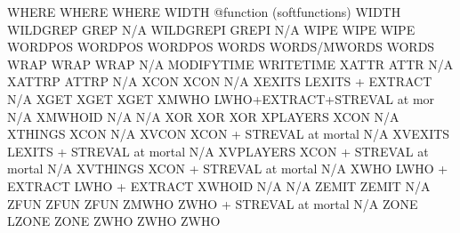 \documentclass[letterpaper,10pt,english]{sphinxmanual}
\begin{document}
\begin{description}
WHERE                   WHERE                        WHERE
WIDTH                   @function (softfunctions)    WIDTH
WILDGREP                GREP                         N/A
WILDGREPI               GREPI                        N/A
WIPE                    WIPE                         WIPE
WORDPOS                 WORDPOS                      WORDPOS
WORDS                   WORDS/MWORDS                 WORDS
WRAP                    WRAP                         WRAP
N/A                     MODIFYTIME                   WRITETIME
XATTR                   ATTR                         N/A
XATTRP                  ATTRP                        N/A
XCON                    XCON                         N/A
XEXITS                  LEXITS + EXTRACT             N/A
XGET                    XGET                         XGET
XMWHO                   LWHO+EXTRACT+STREVAL at mor  N/A
XMWHOID                 N/A                          N/A
XOR                     XOR                          XOR
XPLAYERS                XCON                         N/A
XTHINGS                 XCON                         N/A
XVCON                   XCON + STREVAL at mortal     N/A
XVEXITS                 LEXITS + STREVAL at mortal   N/A
XVPLAYERS               XCON + STREVAL at mortal     N/A
XVTHINGS                XCON + STREVAL at mortal     N/A
XWHO                    LWHO + EXTRACT               LWHO + EXTRACT
XWHOID                  N/A                          N/A
ZEMIT                   ZEMIT                        N/A
ZFUN                    ZFUN                         ZFUN
ZMWHO                   ZWHO + STREVAL at mortal     N/A
ZONE                    LZONE                        ZONE
ZWHO                    ZWHO                         ZWHO

\end{description}
\end{document}
